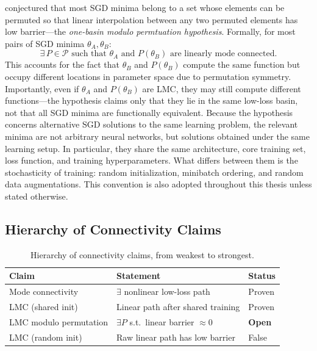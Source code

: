 \documentclass[11pt,a4paper]{report}
\begin{document}
\citet{entezari2021role} conjectured that most SGD minima belong to a set whose elements can be permuted so that linear interpolation between any two permuted elements has low barrier---the \textit{one-basin modulo permtuation hypothesis}. Formally, for most pairs of SGD minima $\theta_A, \theta_B$:
\begin{equation}
\exists\, P \in \mathcal{P} \text{ such that } \theta_A \text{ and } P(\theta_B) \text{ are linearly mode connected.}
\end{equation}
This accounts for the fact that $\theta_B$ and $P(\theta_B)$ compute the same function but occupy different locations in parameter space due to permutation symmetry. Importantly, even if $\theta_A$ and $P(\theta_B)$ are LMC, they may still compute different functions---the hypothesis claims only that they lie in the same low-loss basin, not that all SGD minima are functionally equivalent. Because the hypothesis concerns alternative SGD solutions to the same learning problem, the relevant minima are not arbitrary neural networks, but solutions obtained under the same learning setup. In particular, they share the same architecture, core training set, loss function, and training hyperparameters. What differs between them is the stochasticity of training: random initialization, minibatch ordering, and random data augmentations. This convention is also adopted throughout this thesis unless stated otherwise.

\subsection{Hierarchy of Connectivity Claims}

\begin{table}[H]
    \centering
    \label{tab:hierarchy}
    \begin{tabular}{l l l}
        \toprule
        \textbf{Claim} & \textbf{Statement} & \textbf{Status} \\
        \midrule
        Mode connectivity & $\exists$ nonlinear low-loss path & Proven \\
        LMC (shared init) & Linear path after shared training & Proven \\
        LMC modulo permutation & $\exists P$ s.t.\ linear barrier $\approx 0$ & \textbf{Open} \\
        LMC (random init) & Raw linear path has low barrier & False \\
        \bottomrule
    \end{tabular}
    \caption{Hierarchy of connectivity claims, from weakest to strongest.}

\end{table}
\end{document}
